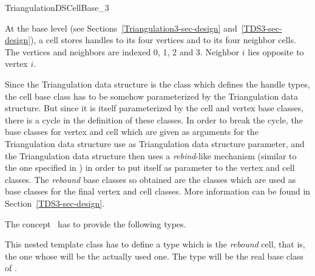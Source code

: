 

\begin{ccRefConcept}{TriangulationDSCellBase_3}


\ccDefinition
  
At the base level 
(see Sections~\ref{Triangulation3-sec-design} and~\ref{TDS3-sec-design}),
a cell stores handles to its four vertices and to its four neighbor cells. 
The vertices and neighbors are indexed 0, 1, 2 and 3. Neighbor $i$
lies opposite to vertex $i$.

Since the Triangulation data structure is the class which defines the handle
types, the cell base class has to be somehow parameterized by the Triangulation
data structure.  But since it is itself parameterized by the cell and vertex
base classes, there is a cycle in the definition of these classes.  In order
to break the cycle, the base classes for vertex and cell which are given as
arguments for the Triangulation data structure use  as Triangulation
data structure parameter, and the Triangulation data structure then uses a
{\it rebind}-like mechanism (similar to the one specified in
) in order to put itself as parameter to the vertex and
cell classes.  The {\it rebound} base classes so obtained are the classes
which are used as base classes for the final vertex and cell classes.
More information can be found in Section~\ref{TDS3-sec-design}.

\ccTypes
{}
\ccThreeToTwo
The concept \ccRefName\ has to provide the following types.

{This nested template class has to define a type  which is the
{\it rebound} cell, that is, the one whose 
will be the actually used one.  The  type will be the real base
class of .}


\end{ccRefConcept}
